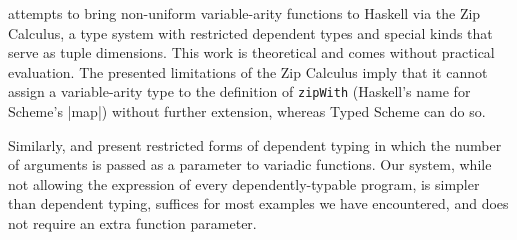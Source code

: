 \begin{schemeregion}
\citet{zip-calc} attempts to bring non-uniform variable-arity
functions to Haskell via the Zip Calculus, a type system with
restricted dependent types and special kinds that serve as tuple
dimensions.  This work is theoretical and  comes without
practical evaluation.  The presented limitations of the Zip
Calculus imply that it cannot assign a variable-arity type to the definition of 
\Verb|zipWith| (Haskell's name for Scheme's \scheme|map|) without
further extension, whereas Typed Scheme can do so.

Similarly, \citet{faking-it} and \citet{moggi} present
restricted forms of dependent typing in which the number of arguments
is passed as a parameter to variadic functions.  Our system, while not
allowing the expression of every dependently-typable program, is
simpler than dependent typing, suffices for most examples we have
encountered, and does not require an extra function parameter.

\end{schemeregion}
